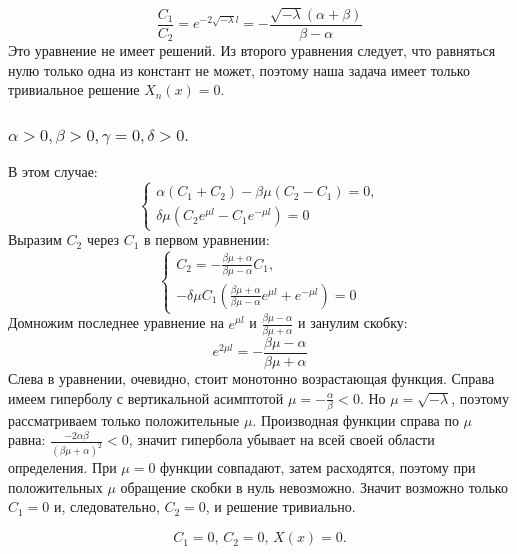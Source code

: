 \documentclass[12pt, a4paper]{report}
\begin{document}
\[\frac{C_1}{C_2} = e^{-2\sqrt{-\lambda}l}=-\frac{\sqrt{-\lambda}(\alpha+\beta)}{\beta-\alpha}\]
Это уравнение не имеет решений.
Из второго уравнения следует, что равняться нулю только одна из констант не может, поэтому наша задача имеет только тривиальное решение  $X_n(x)=0$.

\subsubsection{ $ \alpha > 0, \beta > 0, \gamma = 0, \delta > 0. $}
В этом случае:
\begin{displaymath}
	\begin{cases}
		\alpha (C_{1} + C_{2}) - \beta \mu (C_{2} - C_{1}) = 0, \\
		\delta \mu (C_{2} e^{\mu l} - C_{1} e^{-\mu l}) = 0
	\end{cases}
\end{displaymath}
Выразим $C_{2}$ через $C_{1}$ в первом уравнении:
\begin{displaymath}
	\begin{cases}
		C_{2} = -\frac{\beta \mu + \alpha}{\beta \mu - \alpha} C_{1}, \\
		- \delta \mu C_{1} (\frac{\beta \mu + \alpha}{\beta \mu - \alpha} e^{\mu l} + e^{-\mu l}) = 0
	\end{cases}
\end{displaymath}
Домножим последнее уравнение на $e^{\mu l}$ и $\frac{\beta \mu - \alpha}{\beta \mu + \alpha}$ и занулим скобку:
\[ e^{2\mu l} = -\frac{\beta \mu - \alpha}{\beta \mu + \alpha} \]
Слева в уравнении, очевидно, стоит монотонно возрастающая функция. Справа имеем гиперболу с вертикальной асимптотой $\mu = -\frac{\alpha}{\beta} < 0$. Но $\mu = \sqrt{-\lambda}$, поэтому рассматриваем только положительные $\mu$. Производная функции справа по $\mu$ равна: $\frac{-2\alpha \beta}{(\beta \mu + \alpha)^2} < 0$, значит гипербола убывает на всей своей области определения. При $\mu = 0$ функции совпадают, затем расходятся, поэтому при положительных $\mu$ обращение скобки в нуль невозможно. Значит возможно только $C_{1} = 0$ и, следовательно, $C_{2} = 0$, и решение тривиально.

\[ C_{1} = 0, \, C_{2} = 0, \, X(x) = 0. \]
\end{document}
